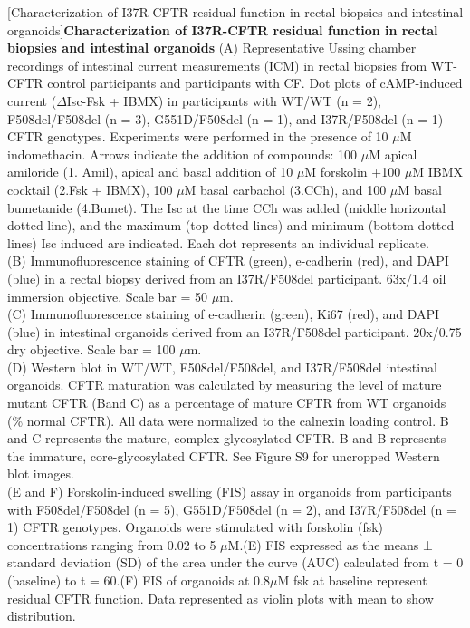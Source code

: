 [Characterization of I37R-CFTR residual function in rectal biopsies and intestinal organoids]{\textbf{Characterization of I37R-CFTR residual function in rectal biopsies and intestinal organoids}}{%
(A) Representative Ussing chamber recordings of intestinal current measurements (ICM) in rectal biopsies from WT-CFTR control participants and participants with CF. Dot plots of cAMP-induced current ($\Delta$Isc-Fsk + IBMX) in participants with WT/WT (n = 2), F508del/F508del (n = 3), G551D/F508del (n = 1), and I37R/F508del (n = 1) CFTR genotypes. Experiments were performed in the presence of 10 $\mu$M indomethacin. Arrows indicate the addition of compounds: 100 $\mu$M apical amiloride (1. Amil), apical and basal addition of 10 $\mu$M forskolin +100 $\mu$M IBMX cocktail (2.Fsk + IBMX), 100 $\mu$M basal carbachol (3.CCh), and 100 $\mu$M basal bumetanide (4.Bumet). The Isc at the time CCh was added (middle horizontal dotted line), and the maximum (top dotted lines) and minimum (bottom dotted lines) Isc induced are indicated. Each dot represents an individual replicate.\\

(B) Immunofluorescence staining of CFTR (green), e-cadherin (red), and DAPI (blue) in a rectal biopsy derived from an I37R/F508del participant. 63x/1.4 oil immersion objective. Scale bar = 50 $\mu$m.\\

(C) Immunofluorescence staining of e-cadherin (green), Ki67 (red), and DAPI (blue) in intestinal organoids derived from an I37R/F508del participant. 20x/0.75 dry objective. Scale bar = 100 $\mu$m.\\

(D) Western blot in WT/WT, F508del/F508del, and I37R/F508del intestinal organoids. CFTR maturation was calculated by measuring the level of mature mutant CFTR (Band C) as a percentage of mature CFTR from WT organoids (\% normal CFTR). All data were normalized to the calnexin loading control. B and C represents the mature, complex-glycosylated CFTR. B and B represents the immature, core-glycosylated CFTR. See Figure S9 for uncropped Western blot images.\\

(E and F) Forskolin-induced swelling (FIS) assay in organoids from participants with F508del/F508del (n = 5), G551D/F508del (n = 2), and I37R/F508del (n = 1) CFTR genotypes. Organoids were stimulated with forskolin (fsk) concentrations ranging from 0.02 to 5 $\mu$M.(E) FIS expressed as the means ± standard deviation (SD) of the area under the curve (AUC) calculated from t = 0 (baseline) to t = 60.(F) FIS of organoids at 0.8$\mu$M fsk at baseline represent residual CFTR function. Data represented as violin plots with mean to show distribution.\\

}
